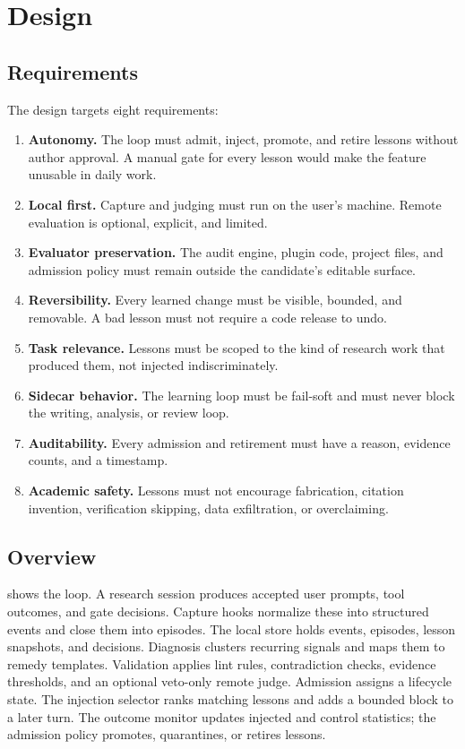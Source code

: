 \section{Design}
\label{sec:design}

\subsection{Requirements}
\label{sec:requirements}
The design targets eight requirements:
\begin{enumerate}[leftmargin=1.5em,itemsep=2pt]
  \item \textbf{Autonomy.} The loop must admit, inject, promote, and retire lessons without author approval. A manual gate for every lesson would make the feature unusable in daily work.
  \item \textbf{Local first.} Capture and judging must run on the user's machine. Remote evaluation is optional, explicit, and limited.
  \item \textbf{Evaluator preservation.} The audit engine, plugin code, project files, and admission policy must remain outside the candidate's editable surface.
  \item \textbf{Reversibility.} Every learned change must be visible, bounded, and removable. A bad lesson must not require a code release to undo.
  \item \textbf{Task relevance.} Lessons must be scoped to the kind of research work that produced them, not injected indiscriminately.
  \item \textbf{Sidecar behavior.} The learning loop must be fail-soft and must never block the writing, analysis, or review loop.
  \item \textbf{Auditability.} Every admission and retirement must have a reason, evidence counts, and a timestamp.
  \item \textbf{Academic safety.} Lessons must not encourage fabrication, citation invention, verification skipping, data exfiltration, or overclaiming.
\end{enumerate}

\subsection{Overview}
\label{sec:overview}
 shows the loop. A research session produces accepted user prompts, tool outcomes, and gate decisions. Capture hooks normalize these into structured events and close them into episodes. The local store holds events, episodes, lesson snapshots, and decisions. Diagnosis clusters recurring signals and maps them to remedy templates. Validation applies lint rules, contradiction checks, evidence thresholds, and an optional veto-only remote judge. Admission assigns a lifecycle state. The injection selector ranks matching lessons and adds a bounded block to a later turn. The outcome monitor updates injected and control statistics; the admission policy promotes, quarantines, or retires lessons.


